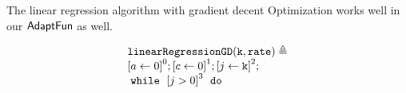 %
\begin{example}
\label{ex:linearregression}
    The linear regression algorithm with gradient decent Optimization works well 
    in our $\textsf{AdaptFun}$ as well.
\begin{figure}
\centering
\begin{subfigure}{0.8\textwidth}
    \centering
    {\small
        \[
        \begin{array}{l}
            \kw{linearRegressionGD(k, rate)} \triangleq \\
                   \clabel{ a \leftarrow 0}^{0} ; 
                   \clabel{ c \leftarrow 0}^{1} ; 
                    \clabel{\assign{j}{\kw{k}} }^{2} ; \\
                    \ewhile ~ \clabel{j > 0}^{3} ~ \edo ~ \\

\end{array}\]}
\end{subfigure}
\end{figure}
\end{example}
